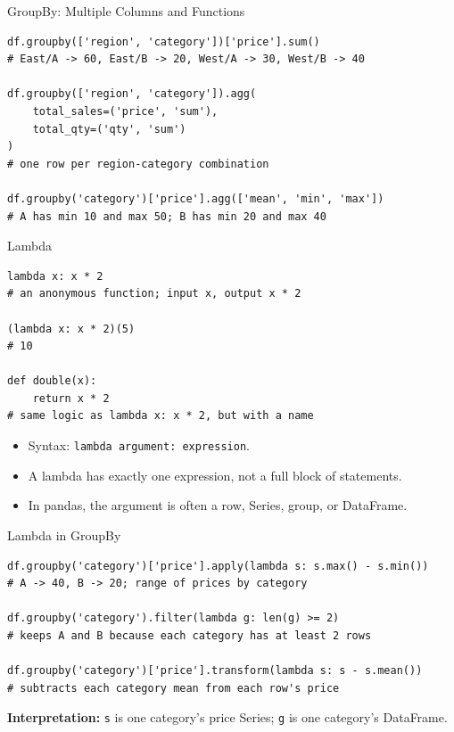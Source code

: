 \documentclass[11pt,aspectratio=43]{beamer}
\begin{document}
\begin{frame}[fragile]{GroupBy: Multiple Columns and Functions}
  \begin{lstlisting}
df.groupby(['region', 'category'])['price'].sum()
# East/A -> 60, East/B -> 20, West/A -> 30, West/B -> 40

df.groupby(['region', 'category']).agg(
    total_sales=('price', 'sum'),
    total_qty=('qty', 'sum')
)
# one row per region-category combination

df.groupby('category')['price'].agg(['mean', 'min', 'max'])
# A has min 10 and max 50; B has min 20 and max 40
  \end{lstlisting}
\end{frame}

\begin{frame}[fragile]{Lambda}
  \begin{lstlisting}
lambda x: x * 2
# an anonymous function; input x, output x * 2

(lambda x: x * 2)(5)
# 10

def double(x):
    return x * 2
# same logic as lambda x: x * 2, but with a name
  \end{lstlisting}
  \begin{itemize}
    \item Syntax: \texttt{lambda argument: expression}.
    \item A lambda has exactly one expression, not a full block of statements.
    \item In pandas, the argument is often a row, Series, group, or DataFrame.
  \end{itemize}
\end{frame}

\begin{frame}[fragile]{Lambda in GroupBy}
  \begin{lstlisting}
df.groupby('category')['price'].apply(lambda s: s.max() - s.min())
# A -> 40, B -> 20; range of prices by category

df.groupby('category').filter(lambda g: len(g) >= 2)
# keeps A and B because each category has at least 2 rows

df.groupby('category')['price'].transform(lambda s: s - s.mean())
# subtracts each category mean from each row's price
  \end{lstlisting}
  \textbf{Interpretation:} \texttt{s} is one category's price Series; \texttt{g} is one category's DataFrame.
\end{frame}
\end{document}

